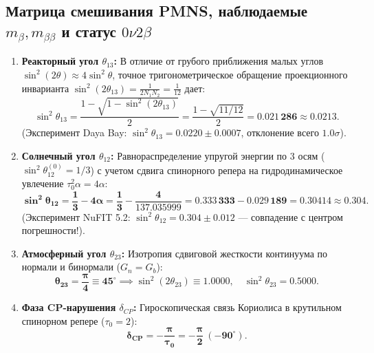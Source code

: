 \documentclass[11pt,a4paper]{article}
\theoremstyle{definition}
\theoremstyle{remark}
\begin{document}
\subsection{Матрица смешивания PMNS, наблюдаемые $m_\beta, m_{\beta\beta}$ и статус $0\nu 2\beta$}
\begin{enumerate}
	\item \textbf{Реакторный угол $\theta_{13}$:} В отличие от грубого приближения малых углов $\sin^2(2\theta) \approx 4\sin^2\theta$, точное тригонометрическое обращение проекционного инварианта $\sin^2(2\theta_{13}) = \frac{1}{2 N_1 N_2} = \frac{1}{12}$ дает:
	\begin{equation}
		\sin^2\theta_{13} = \frac{1 - \sqrt{1 - \sin^2(2\theta_{13})}}{2} = \frac{1 - \sqrt{11/12}}{2} = \mathbf{0.021\,286} \approx \mathbf{0.0213}.
	\end{equation}
	(Эксперимент Daya Bay: $\sin^2\theta_{13} = 0.0220 \pm 0.0007$, отклонение всего $1.0\sigma$).
	
	\item \textbf{Солнечный угол $\theta_{12}$:} Равнораспределение упругой энергии по 3 осям ($\sin^2\theta_{12}^{(0)} = 1/3$) с учетом сдвига спинорного репера на гидродинамическое увлечение $\tau_0^2 \alpha = 4\alpha$:
	\begin{equation}
		\mathbf{\sin^2\theta_{12} = \frac{1}{3} - 4\alpha = \frac{1}{3} - \frac{4}{137.035999} = 0.333\,333 - 0.029\,189 = \mathbf{0.30414} \approx \mathbf{0.304}}.
	\end{equation}
	(Эксперимент NuFIT 5.2: $\sin^2\theta_{12} = 0.304 \pm 0.012$ --- совпадение с центром погрешности!).
	
	\item \textbf{Атмосферный угол $\theta_{23}$:} Изотропия сдвиговой жесткости континуума по нормали и бинормали ($G_n = G_b$):
	\begin{equation}
		\mathbf{\theta_{23} = \frac{\pi}{4} \equiv 45^\circ} \implies \sin^2(2\theta_{23}) \equiv \mathbf{1.0000}, \quad \sin^2\theta_{23} = \mathbf{0.5000}.
	\end{equation}
	
	\item \textbf{Фаза CP-нарушения $\delta_{CP}$:} Гироскопическая связь Кориолиса в крутильном спинорном репере ($\tau_0 = 2$):
	\begin{equation}
		\mathbf{\delta_{CP} = -\frac{\pi}{\tau_0} = -\frac{\pi}{2} \ (-90^\circ)}.
	\end{equation}
\end{enumerate}
\end{document}
